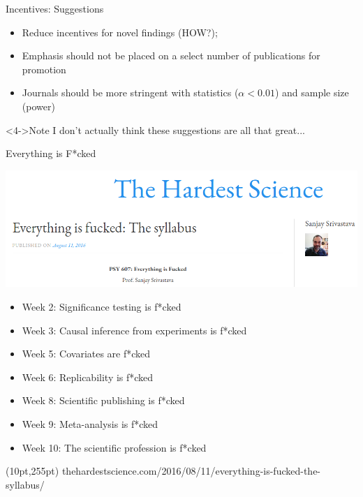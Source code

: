 \documentclass{beamer}
\begin{document}
\begin{frame}{Incentives: Suggestions}
	\begin{itemize}
		\item<1-> Reduce incentives for novel findings (HOW?); 
		\item<2-> Emphasis should not be placed on a select number of publications for promotion
		\item<3-> Journals should be more stringent with statistics ($\alpha < 0.01$) and sample size (power)
	\end{itemize}

	\begin{alertblock}<4->{Note}
		I don't actually think these suggestions are all that great...
	\end{alertblock}
\end{frame}

\begin{frame}{Everything is F*cked}
	

	\begin{center}
	\includegraphics[width=.7\textwidth]{../images/everything.png}
	\end{center}
	\begin{itemize}
		\item<2-> Week 2: Significance testing is f*cked
		\item<2-> Week 3: Causal inference from experiments is f*cked
		\item<2-> Week 5: Covariates are f*cked
		\item<2-> Week 6: Replicability is f*cked
		\item<2-> Week 8: Scientific publishing is f*cked
		\item<2-> Week 9: Meta-analysis is f*cked
		\item<2-> Week 10: The scientific profession is f*cked
	\end{itemize}

	\begin{textblock*}{300pt}(10pt,255pt)
		\tiny{thehardestscience.com/2016/08/11/everything-is-fucked-the-syllabus/}

	\end{textblock*}
\end{frame}
\end{document}
